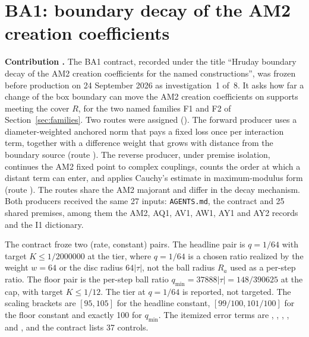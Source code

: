 \section{BA1: boundary decay of the AM2 creation coefficients}
\label{sec:ba1}

\textbf{Contribution .} The BA1 contract, recorded under
the title ``Hruday boundary decay of the AM2 creation coefficients for the
named constructions'', was frozen before production on 24 September 2026 as
investigation~1 of~8. It asks how far a change of the box boundary can move
the AM2 creation coefficients on supports meeting the cover $R$, for the two
named families F1 and F2 of Section~\ref{sec:families}. Two routes were
assigned
(). The
forward producer uses a diameter-weighted anchored norm that pays a fixed loss
once per interaction term, together with a difference weight that grows with
distance from the boundary source (route ). The reverse
producer, under premise isolation, continues the AM2 fixed point to complex
couplings, counts the order at which a distant term can enter, and applies
Cauchy's estimate in maximum-modulus form (route ). The
routes share the AM2 majorant and differ in the decay mechanism. Both
producers received the same 27 inputs: \texttt{AGENTS.md}, the contract and
25 shared premises, among them the AM2, AQ1, AV1, AW1, AY1 and AY2 records and
the I1 dictionary.

The contract froze two (rate, constant) pairs. The headline pair is $q=1/64$
with target $K\le1/2000000$ at the  tier, where
$q=1/64$ is a chosen ratio realized by the weight $w=64$ or the disc radius
$64|\tau|$, not the ball radius $R_a$ used as a per-step ratio. The floor
pair is the per-step ball ratio $q_{\min}=37888|\tau|=148/390625$ at the cap,
with target $K\le1/12$. The  tier at $q=1/64$ is
reported, not targeted. The scaling brackets are $[95,105]$ for the headline
constant, $[99/100,101/100]$ for the floor constant and exactly 100 for
$q_{\min}$. The itemized error terms are ,
, ,
,  and
, and the contract lists 37 controls.

